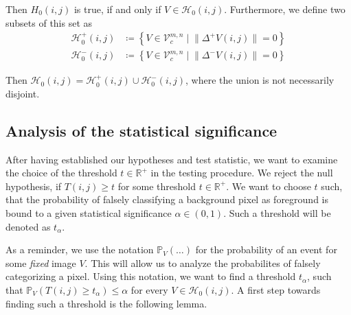 \documentclass[a4paper,12pt]{article}
\newcommand{\norm}[1]{\lVert#1\rVert}
\theoremstyle{plain}
\theoremstyle{definition}
\begin{document}
Then $H_0(i, j)$ is true, if and only if $V \in \mathcal{H}_0(i, j)$. Furthermore, we define two subsets of this set as
\begin{align}
	\mathcal{H}_0^+(i, j) &\coloneqq \left\{ V \in \mathcal{V}_c^{m, n} \mid \norm{\Delta^+ V(i, j)} = 0 \right\} \label{setH0+} \\
	\mathcal{H}_0^-(i, j) &\coloneqq \left\{ V \in \mathcal{V}_c^{m, n} \mid \norm{\Delta^- V(i, j)} = 0 \right\} \label{setH0-}
\end{align}

Then $\mathcal{H}_0(i, j) = \mathcal{H}_0^+(i, j) \cup \mathcal{H}_0^-(i, j)$, where the union is not necessarily disjoint.

\newpage

\subsection{Analysis of the statistical significance}\label{sectionstatisticalsignificance}

After having established our hypotheses and test statistic, we want to examine the choice of the threshold $t \in \mathbb{R}^+$ in the testing procedure. We reject the null hypothesis, if $T(i, j) \geq t$ for some threshold $t \in \mathbb{R}^+$. We want to choose $t$ such, that the probability of falsely classifying a background pixel as foreground is bound to a given statistical significance $\alpha \in (0, 1)$. Such a threshold will be denoted as $t_\alpha$.

As a reminder, we use the notation $\mathbb{P}_V( \ldots )$ for the probability of an event for some \emph{fixed} image $V$. This will allow us to analyze the probabilites of falsely categorizing a pixel. Using this notation, we want to find a threshold $t_\alpha$, such that $\mathbb{P}_V( T(i, j) \geq t_\alpha ) \leq \alpha$ for every $V \in \mathcal{H}_0(i, j)$. A first step towards finding such a threshold is the following lemma.
\end{document}
